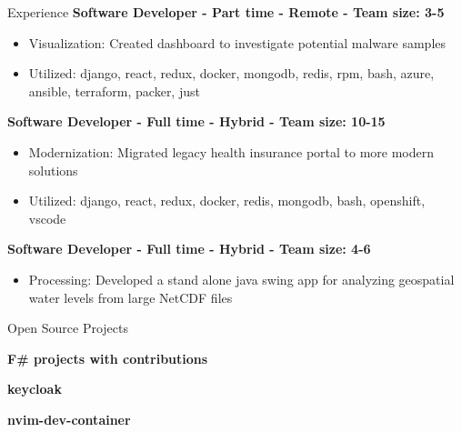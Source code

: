 \documentclass{resume} %
\begin{document}
\begin{rSection}{Experience}
\textbf{Software Developer - Part time - Remote - Team size: 3-5} \\

\begin{itemize}
  \itemsep -2pt {}
      \item Visualization: Created dashboard to investigate potential malware samples
    \item Utilized: django, react, redux, docker, mongodb, redis, rpm, bash, azure, ansible, terraform, packer, just
\end{itemize}

\textbf{Software Developer - Full time - Hybrid - Team size: 10-15} \\

\begin{itemize}
  \itemsep -2pt {}
      \item Modernization: Migrated legacy health insurance portal to more modern solutions
    \item Utilized: django, react, redux, docker, redis, mongodb, bash, openshift, vscode
\end{itemize}

\textbf{Software Developer - Full time - Hybrid - Team size: 4-6} \\

\begin{itemize}
  \itemsep -2pt {}
      \item Processing: Developed a stand alone java swing app for analyzing geospatial water levels from large NetCDF files
\end{itemize}

\end{rSection}


\begin{rSection}{Open Source Projects}
\vspace{-0.90em}
  \item \textbf{F\# projects with contributions} 
  \item \textbf{keycloak} 
  \item \textbf{nvim-dev-container} 
\end{rSection}
\end{document}
